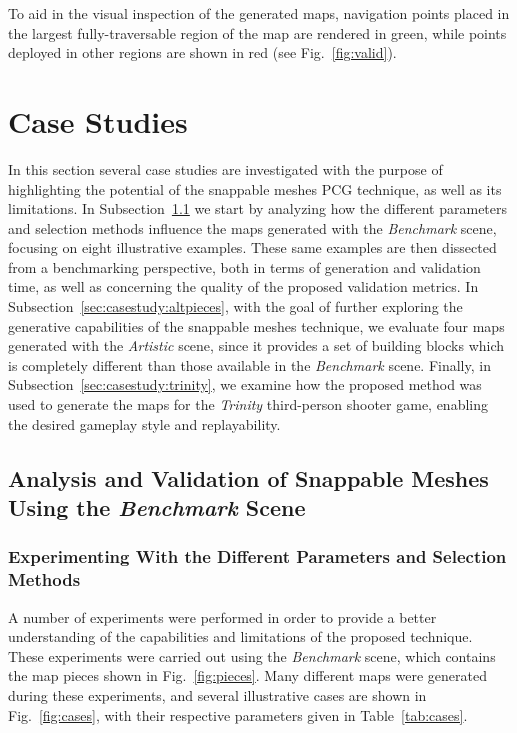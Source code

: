 \documentclass[journal]{IEEEtran}
\begin{document}
To aid in the visual inspection of the generated maps, navigation points placed in
the largest fully-traversable region of the map are rendered in green, while points
deployed in other regions are shown in red (see Fig.~\ref{fig:valid}).

\section{Case Studies}
\label{sec:casestudy}

In this section several case studies are investigated with the purpose of
highlighting the potential of the snappable meshes PCG technique, as well as its
limitations. In Subsection~\ref{sec:casestudy:benchmarks} we start by analyzing how
the different parameters and selection methods influence the maps generated with the
\textit{Benchmark} scene, focusing on eight illustrative examples. These same
examples are then dissected from a benchmarking perspective, both in terms of
generation and validation time, as well as concerning the quality of the proposed
validation metrics.
In Subsection~\ref{sec:casestudy:altpieces}, with the goal of further exploring
the generative capabilities of the snappable meshes technique, we evaluate four maps
generated with the \textit{Artistic} scene, since it provides a set of building blocks
which is completely different than those available in the \textit{Benchmark} scene.
Finally, in Subsection~\ref{sec:casestudy:trinity}, we examine how the proposed method
was used to generate the maps for the \textit{Trinity} third-person shooter game,
enabling the desired gameplay style and replayability.

\subsection{Analysis and Validation of Snappable Meshes Using the \textit{Benchmark} Scene}
\label{sec:casestudy:benchmarks}

\subsubsection{Experimenting With the Different Parameters and Selection Methods}
\label{sec:casestudy:benchmarks:piecesmap}

A number of experiments were performed in order to provide a better understanding of
the capabilities and limitations of the proposed technique. These experiments were
carried out using the \textit{Benchmark} scene, which contains the map pieces shown in
Fig.~\ref{fig:pieces}. Many different maps were generated during these experiments,
and several illustrative cases are shown in Fig.~\ref{fig:cases}, with their respective
parameters given in Table~\ref{tab:cases}.
\end{document}
